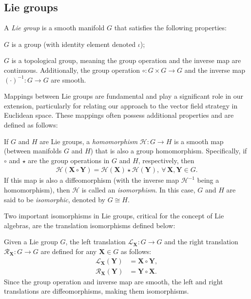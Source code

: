 \subsection{Lie groups}
\begin{definition}
    A \emph{Lie group} is a smooth manifold $G$ that satisfies the following properties:
    \begin{property}
        \item $G$ is a group (with identity element denoted $\iota$);
        \item $G$ is a topological group, meaning the group operation and the inverse map are continuous. Additionally, the group operation $\circ: G\times G\to G$ and the inverse map $(\cdot)^{-1}: G\to G$ are smooth.
    \end{property}
\end{definition}

Mappings between Lie groups are fundamental and play a significant role in our extension, particularly for relating our approach to the vector field strategy in Euclidean space. These mappings often possess additional properties and are defined as follows:
\begin{definition}
    If $G$ and $H$ are Lie groups, a \emph{homomorphism} $\mathcal{H}: G\to H$ is a smooth map (between manifolds $G$ and $H$) that is also a group homomorphism. Specifically, if $\circ$ and $\star$ are the group operations in $G$ and $H$, respectively, then
    \begin{align*}
        \mathcal{H}(\mathbf{X}\circ\mathbf{Y}) = \mathcal{H}(\mathbf{X})\star\mathcal{H}(\mathbf{Y}),\ \forall\,\mathbf{X},\mathbf{Y}\in G.
    \end{align*}
    If this map is also a diffeomorphism (with the inverse map $\mathcal{H}^{-1}$ being a homomorphism), then $\mathcal{H}$ is called an \emph{isomorphism}. In this case, $G$ and $H$ are said to be \emph{isomorphic}, denoted by $G\cong H$.
\end{definition}

Two important isomorphisms in Lie groups, critical for the concept of Lie algebras, are the translation isomorphisms defined below:
\begin{definition}
    Given a Lie group $G$, the left translation $\mathcal{L}_{\mathbf{X}}: G\to G$ and the right translation $\mathcal{R}_{\mathbf{X}}: G\to G$ are defined for any $\mathbf{X}\in G$ as follows:
    \begin{align}
        \mathcal{L}_{\mathbf{X}}(\mathbf{Y}) &= \mathbf{X}\circ\mathbf{Y},\\
        \mathcal{R}_{\mathbf{X}}(\mathbf{Y}) &= \mathbf{Y}\circ\mathbf{X}.
    \end{align}
    Since the group operation and inverse map are smooth, the left and right translations are diffeomorphisms, making them isomorphisms.
\end{definition}

